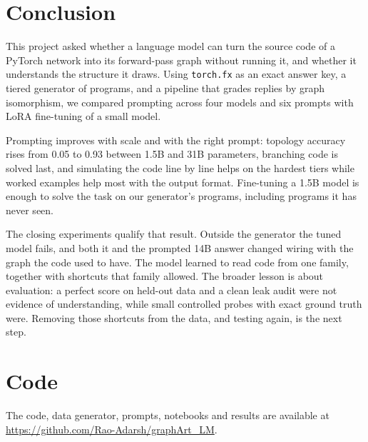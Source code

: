 \documentclass[twoside,english]{article}
\begin{document}
\section{Conclusion} \label{sec:conclusion}
This project asked whether a language model can turn the source code of a PyTorch network into
its forward-pass graph without running it, and whether it understands the structure it draws. Using
\texttt{torch.fx} as an exact answer key, a tiered generator of programs, and a pipeline that grades
replies by graph isomorphism, we compared prompting across four models and six prompts with LoRA
fine-tuning of a small model.

Prompting improves with scale and with the right prompt: topology accuracy rises from 0.05 to 0.93
between 1.5B and 31B parameters, branching code is solved last, and simulating the code line by line
helps on the hardest tiers while worked examples help most with the output format. Fine-tuning a 1.5B
model is enough to solve the task on our generator's programs, including programs it has never seen.

The closing experiments qualify that result. Outside the generator the tuned model fails, and both it
and the prompted 14B answer changed wiring with the graph the code used to have. The model learned to
read code from one family, together with shortcuts that family allowed. The broader lesson is about
evaluation: a perfect score on held-out data and a clean leak audit were not evidence of
understanding, while small controlled probes with exact ground truth were. Removing those shortcuts
from the data, and testing again, is the next step.

\section*{Code}
The code, data generator, prompts, notebooks and results are available at
\url{https://github.com/Rao-Adarsh/graphArt_LM}.

\nocite{*}


\end{document}
